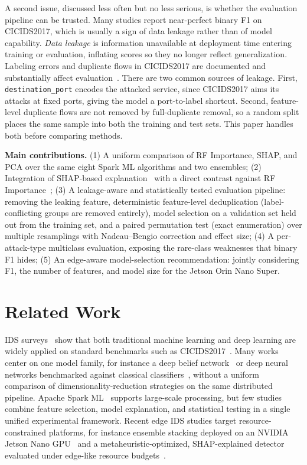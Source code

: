 \documentclass[11pt,conference,a4paper]{IEEEtran}
\begin{document}
A second issue, discussed less often but no less serious, is whether the evaluation pipeline can be trusted. Many studies report near-perfect binary F1 on CICIDS2017, which is usually a sign of data leakage rather than of model capability. \emph{Data leakage} is information unavailable at deployment time entering training or evaluation, inflating scores so they no longer reflect generalization. Labeling errors and duplicate flows in CICIDS2017 are documented and substantially affect evaluation~\cite{lanvin2023errors}. There are two common sources of leakage. First, \texttt{destination\_port} encodes the attacked service, since CICIDS2017 aims its attacks at fixed ports, giving the model a port-to-label shortcut. Second, feature-level duplicate flows are not removed by full-duplicate removal, so a random split places the same sample into both the training and test sets. This paper handles both before comparing methods.

\textbf{Main contributions.}
(1) A uniform comparison of RF Importance, SHAP, and PCA over the same eight Spark ML algorithms and two ensembles;
(2) Integration of SHAP-based explanation~\cite{lundberg2017unified} with a direct contrast against RF Importance~\cite{breiman2001random};
(3) A leakage-aware and statistically tested evaluation pipeline: removing the leaking feature, deterministic feature-level deduplication (label-conflicting groups are removed entirely), model selection on a validation set held out from the training set, and a paired permutation test (exact enumeration) over multiple resamplings with Nadeau--Bengio correction and effect size;
(4) A per-attack-type multiclass evaluation, exposing the rare-class weaknesses that binary F1 hides;
(5) An edge-aware model-selection recommendation: jointly considering F1, the number of features, and model size for the Jetson Orin Nano Super.

\section{Related Work}
\label{sec:related}

IDS surveys~\cite{ring2019survey,khraisat2019survey,ferrag2020deep} show that both traditional machine learning and deep learning are widely applied on standard benchmarks such as CICIDS2017~\cite{sharafaldin2018toward}. Many works center on one model family, for instance a deep belief network~\cite{alrawashdeh2016toward} or deep neural networks benchmarked against classical classifiers~\cite{vinayakumar2019deep}, without a uniform comparison of dimensionality-reduction strategies on the same distributed pipeline. Apache Spark ML~\cite{zaharia2010spark,meng2016mllib} supports large-scale processing, but few studies combine feature selection, model explanation, and statistical testing in a single unified experimental framework. Recent edge IDS studies target resource-constrained platforms, for instance ensemble stacking deployed on an NVIDIA Jetson Nano GPU~\cite{baalaji2025ensemble} and a metaheuristic-optimized, SHAP-explained detector evaluated under edge-like resource budgets~\cite{asghar2026hedid}.
\end{document}
